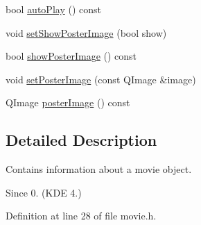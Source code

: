 \begin{DoxyCompactItemize}
\item 
bool \hyperlink{classOkular_1_1Movie_afee77daf9321afaf6c164a464d516940}{auto\+Play} () const 
\item 
void \hyperlink{classOkular_1_1Movie_a5bb46f14d21365b05afbd8c8bcca2dbe}{set\+Show\+Poster\+Image} (bool show)
\item 
bool \hyperlink{classOkular_1_1Movie_abbd73c60d6503641c04c945ba00cc809}{show\+Poster\+Image} () const 
\item 
void \hyperlink{classOkular_1_1Movie_a232c2d19a1b1f8e2bbfaf1debeaf18f4}{set\+Poster\+Image} (const Q\+Image \&image)
\item 
Q\+Image \hyperlink{classOkular_1_1Movie_a5d4159ce41a4e2dc7688f7c507827e2c}{poster\+Image} () const 
\end{DoxyCompactItemize}


\subsection{Detailed Description}
Contains information about a movie object. 

\begin{DoxySince}{Since}
0. (K\+D\+E 4.) 
\end{DoxySince}


Definition at line 28 of file movie.\+h.



